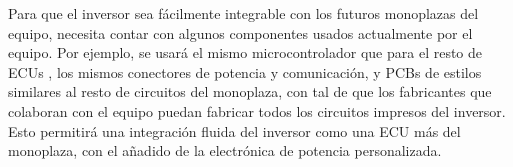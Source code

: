 Para que el inversor sea fácilmente integrable con los futuros monoplazas del equipo, necesita contar con algunos componentes usados actualmente por el equipo. Por ejemplo, se usará el mismo microcontrolador que para el resto de ECUs \cite{Costa2024}, los mismos conectores de potencia y comunicación, y PCBs de estilos similares al resto de circuitos del monoplaza, con tal de que los fabricantes que colaboran con el equipo puedan fabricar todos los circuitos impresos del inversor. Esto permitirá una integración fluida del inversor como una ECU más del monoplaza, con el añadido de la electrónica de potencia personalizada.